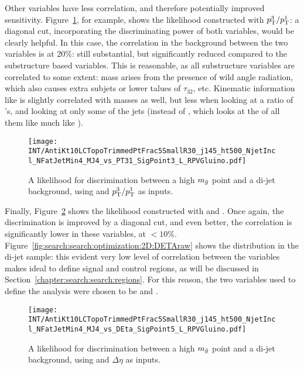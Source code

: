 

Other variables have less correlation, and therefore potentially improved sensitivity. Figure~\ref{fig:search:search:optimization:2D:PT31}, for example, shows the likelihood constructed with $p_{\text{T}}^3/p_{\text{T}}^1$: a diagonal cut, incorporating the discriminating power of both variables, would be clearly helpful. In this case, the correlation in the background between the two variables is at $20\%$: still substantial, but significantly reduced compared to the substructure based variables. This is reasonable, as all substructure variables are correlated to some extent: mass arises from the presence of wild angle radiation, which also causes extra subjets or lower talues of $\tau_{32}$, etc. Kinematic information like \pt is slightly correlated with masses as well, but less when looking at a ratio of \pt's, and looking at only some of the jets (instead of \Ht, which looks at the \pt of all them like much like \MJ).


\begin{figure}
\centering
\texttt{[image: INT/AntiKt10LCTopoTrimmedPtFrac5SmallR30\_j145\_ht500\_NjetIncl\_NFatJetMin4\_MJ4\_vs\_PT31\_SigPoint3\_L\_RPVGluino.pdf]}
\caption{A likelihood for discrimination between a high $m_{\tilde{g}}$ point and a \herwigpp di-jet background, using \MJ and $p_{\text{T}}^3/p_{\text{T}}^1$ as inputs.}
\label{fig:search:search:optimization:2D:PT31}
\end{figure}


Finally, Figure~\ref{fig:search:search:optimization:2D:DETA} shows the likelihood constructed with \Deta and \MJ. Once again, the discrimination is improved by a diagonal cut, and even better, the correlation is significantly lower in these variables, at $<10\%$. Figure~\ref{fig:search:search:optimization:2D:DETAraw} shows the distribution in the \herwigpp di-jet sample: this evident very low level of correlation between the variables makes \Deta ideal to define signal and control regions, as will be discussed in Section~\ref{chapter:search:search:regions}. For this reason, the two variables used to define the analysis were chosen to be \MJ and \Deta.


\begin{figure}
\centering
\texttt{[image: INT/AntiKt10LCTopoTrimmedPtFrac5SmallR30\_j145\_ht500\_NjetIncl\_NFatJetMin4\_MJ4\_vs\_DEta\_SigPoint5\_L\_RPVGluino.pdf]}
\caption{A likelihood for discrimination between a high $m_{\tilde{g}}$ point and a \herwigpp di-jet background, using \MJ and $\Delta \eta$ as inputs.}
\label{fig:search:search:optimization:2D:DETA}
\end{figure}

